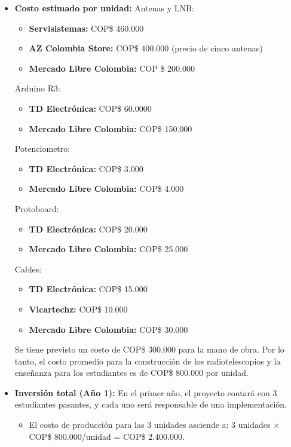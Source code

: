 \begin{itemize}
    \item \textbf{Costo estimado por unidad:}
    Antenas y LNB:                                        
		\begin{itemize}
        \item \textbf{Servisistemas:} COP\$ 460.000
        \item \textbf{AZ Colombia Store:} COP\$ 400.000 (precio de cinco antenas)     
        \item \textbf{{Mercado Libre Colombia:}} COP \$ 200.000
    \end{itemize}
    Arduino R3:           
    \begin{itemize}
        \item \textbf{TD Electrónica:} COP\$ 60.0000
        \item \textbf{Mercado Libre Colombia:} COP\$ 150.000
    \end{itemize}                                                      
		Potenciometro:                                                     
		\begin{itemize}
        \item \textbf{TD Electrónica:} COP\$ 3.000
        \item \textbf{Mercado Libre Colombia:} COP\$ 4.000
    \end{itemize}                                                      
		Protoboard:
    \begin{itemize}
        \item \textbf{TD Electrónica:} COP\$ 20.000
        \item \textbf{Mercado Libre Colombia:} COP\$ 25.000
    \end{itemize}       
    Cables:                                                           
    \begin{itemize}
        \item \textbf{TD Electrónica:} COP\$ 15.000
        \item \textbf{Vicartechz:} COP\$ 10.000
        \item \textbf{Mercado Libre Colombia:} COP\$ 30.000
    \end{itemize}

		Se tiene previsto un costo de COP\$ 300.000 para la mano de obra. Por lo 
		tanto, el costo promedio para la construcción de los radiotelescopios y la 
		enseñanza para los estudiantes es de COP\$ 800.000 por unidad.
   
    \item \textbf{Inversión total (Año 1):} En el primer año, el proyecto 
			contará con 3 estudiantes pasantes, y cada uno será responsable de una 
			implementación.
    \begin{itemize}
        \item El costo de producción para las 3 unidades asciende a: 
					3 unidades $\times$ COP\$ 800.000/unidad = COP\$ 2.400.000.
    \end{itemize}
\end{itemize}

